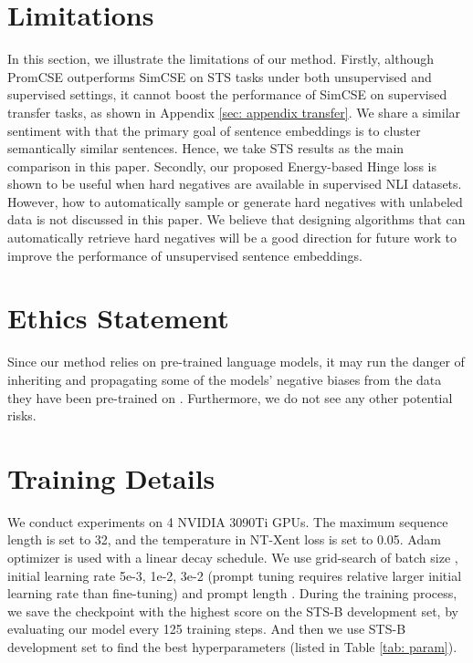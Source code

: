 \documentclass[11pt]{article}
\begin{document}
\section*{Limitations}
In this section, we illustrate the limitations of our method. Firstly, although PromCSE outperforms SimCSE on STS tasks under both unsupervised and supervised settings, 
it cannot boost the performance of SimCSE on supervised transfer tasks, as shown in Appendix \ref{sec: appendix transfer}. 
We share a similar sentiment with \cite{ReimersG19sbert} that the primary goal of sentence embeddings is to cluster semantically similar sentences. Hence, we take STS results as the main comparison in this paper. 
Secondly, our proposed Energy-based Hinge loss is shown to be useful when hard negatives are available in supervised NLI datasets. However, how to automatically sample or generate hard negatives with unlabeled data is not discussed in this paper. We believe that designing algorithms that can automatically retrieve hard negatives will be a good direction for future work to improve the performance of unsupervised sentence embeddings.


\section*{Ethics Statement}
Since our method relies on pre-trained language models, it may run the danger of inheriting and propagating some of the models' negative biases from the data they have been pre-trained on \cite{BenderGMS21bias}. Furthermore, we do not see any other potential risks.





\appendix

\section{Training Details}
\label{sec:appendix a}
We conduct experiments on 4 NVIDIA 3090Ti GPUs. The maximum sequence length is set to 32, and the temperature  in NT-Xent loss is set to 0.05. Adam optimizer is used with a linear decay schedule.
We use grid-search of batch size , initial learning rate 5e-3, 1e-2, 3e-2 (prompt tuning requires relative larger initial learning rate than fine-tuning) and prompt length . 
During the training process, we save the checkpoint with the highest score on the STS-B development set, by evaluating our model every 125 training steps. And then we use STS-B development set to find the best hyperparameters (listed in Table \ref{tab: param}).
\end{document}

